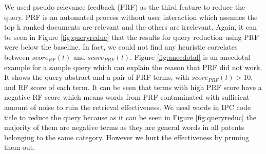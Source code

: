 \documentclass{sig-alternate}
\begin{document}
We used pseudo relevance feedback (PRF) as the third feature to reduce the query. PRF is an automated process without user interaction which assumes the top k ranked documents are relevant and the others are irrelevant. Again, it can be seen in Figure \ref{fig:queryreduc} that the results for query reduction using PRF were below the baseline. In fact, we could not find any heuristic correlates between  $ score_{RF}(t)$ and $ score_{PRF}(t)$. Figure \ref{fig:anecdotal} is an anecdotal example for a sample query which can explain the reason that PRF did not work. It shows the query abstract and a pair of PRF terms, with $ score_{PRF}(t)>10 $, and RF score of each term. It can be seen that terms with high PRF score have a negative RF score which means words from PRF contaminated with sufficient amount of noise to ruin the retrieval effectiveness. 
We used words in IPC code title to reduce the query because as it can be seen in Figure \ref{fig:queryreduc} the majority of them are negative terms as they are general words in all patents belonging to the same category. However we hurt the effectiveness by pruning them out.
\end{document}

